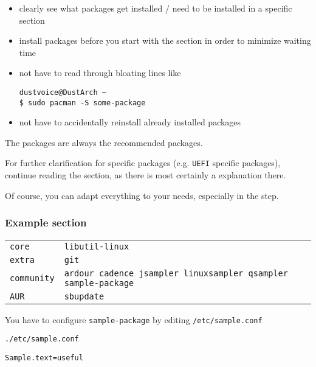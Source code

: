 \documentclass[9pt]{report}
\newenvironment{NOTE}
{\begin{tcolorbox}[colback=admonitionBG,coltitle=draculaFG,colframe=draculaBlue,colbacktitle=draculaBlue,title=NOTE]}
{\end{tcolorbox}}
\newenvironment{packagetable}
{\begin{longtabu}to \textwidth [b]{X[1,r]|X[1,l]}}
{\end{longtabu}}
\newenvironment{mintedlisting}{\captionsetup{format=plain,width=.75\textwidth,type=listing}}{}
\begin{document}
\begin{itemize}

    \item clearly see what packages get installed / need to be installed in a specific section

    \item install packages before you start with the section in order to minimize waiting time

    \item not have to read through bloating lines like

        \begin{verbatim}
dustvoice@DustArch ~
$ sudo pacman -S some-package
        \end{verbatim}
    \item not have to accidentally reinstall already installed packages

\end{itemize}


\begin{NOTE}
    The packages are always the recommended packages.

    For further clarification for specific packages (e.g. \texttt{UEFI} specific packages), continue reading the section, as there is most certainly a explanation there.

    Of course, you can adapt everything to your needs, especially in the \hyperlink{additional-setup-packages}{} step.
\end{NOTE}

\newpage

\hypertarget{x-example-section}{\subsubsection{Example section}}
\begin{packagetable}
    \texttt{core} & \texttt{libutil-linux} \\ 
    \texttt{extra} & \texttt{git} \\ 
    \texttt{community} & \texttt{ardour cadence jsampler linuxsampler qsampler sample-package} \\ 
    \texttt{AUR} & \texttt{sbupdate} \\ 
\end{packagetable}

You have to configure \texttt{sample-package} by editing \texttt{/etc/sample.conf}


\begin{mintedlisting}
\caption*{\texttt{./etc/sample.conf}}
\begin{verbatim}
Sample.text=useful
\end{verbatim}
\end{mintedlisting}
\end{document}
